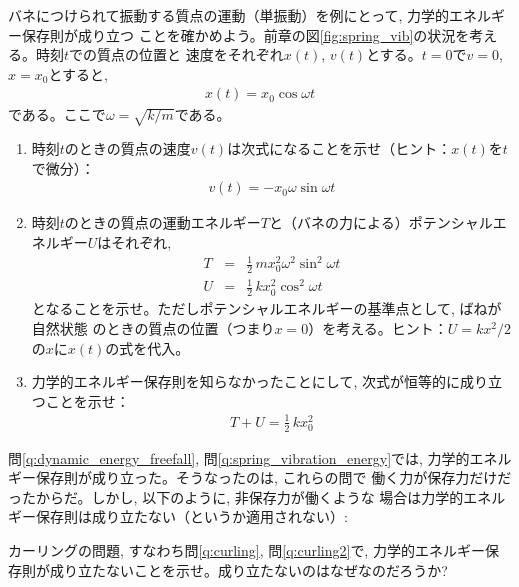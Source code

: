 %
\begin{q}\label{q:spring_vibration_energy}
バネにつけられて振動する質点の運動（単振動）を例にとって, 力学的エネルギー保存則が成り立つ
ことを確かめよう。前章の図\ref{fig:spring_vib}の状況を考える。時刻$t$での質点の位置と
速度をそれぞれ$x(t)$, $v(t)$とする。$t=0$で$v=0$, $x=x_0$とすると, 
\begin{eqnarray} 
x(t)=x_0\cos\omega t\label{eq:spring_vibration_energyx}
\end{eqnarray} 
である。ここで$\omega=\sqrt{k/m}$である。
\begin{enumerate}
\item 時刻$t$のときの質点の速度$v(t)$は次式になることを示せ（ヒント：$x(t)$を$t$で微分）：
\begin{eqnarray} 
v(t)=-x_0\omega\sin\omega t\label{eq:spring_vibration_energyv}
\end{eqnarray} 
\item 時刻$t$のときの質点の運動エネルギー$T$と（バネの力による）ポテンシャルエネルギー$U$はそれぞれ, 
\begin{eqnarray}
T&=&\frac{1}{2}\,mx_0^2\omega^2\sin^2\omega t\label{eq:spring_vibration_energyT}\\
U&=&\frac{1}{2}\,kx_0^2\cos^2\omega t\label{eq:spring_vibration_energyU}
\end{eqnarray}
となることを示せ。ただしポテンシャルエネルギーの基準点として, ばねが自然状態
のときの質点の位置（つまり$x=0$）を考える。ヒント：$U=kx^2/2$の$x$に$x(t)$の式を代入。
\item 力学的エネルギー保存則を知らなかったことにして, 次式が恒等的に成り立つことを示せ：
\begin{eqnarray} 
T+U=\frac{1}{2}\,kx_0^2
\end{eqnarray} 
\end{enumerate}
\end{q}

問\ref{q:dynamic_energy_freefall}, 問\ref{q:spring_vibration_energy}では, 
力学的エネルギー保存則が成り立った。そうなったのは, これらの問で
働く力が保存力だけだったからだ。しかし, 以下のように, 非保存力が働くような
場合は力学的エネルギー保存則は成り立たない（というか適用されない）:
\vspace{0.2cm}

\begin{q}\label{q:curling3} カーリングの問題, すなわち問\ref{q:curling}, 問\ref{q:curling2}で, 
力学的エネルギー保存則が成り立たないことを示せ。成り立たないのはなぜなのだろうか?
\end{q}
\vspace{0.2cm}

